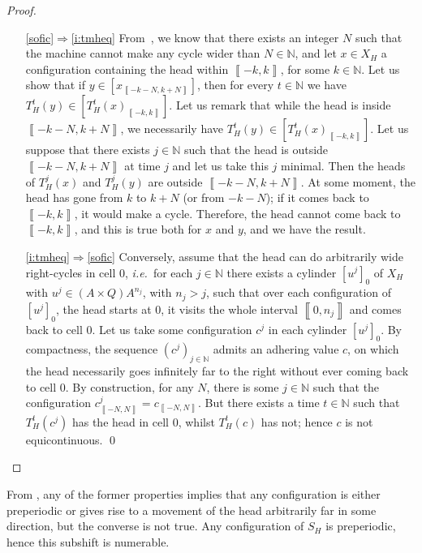 \documentclass{llncs}
\newcommand{\Nset}{{\mathbb N}}
\newcommand{\co}[2]{\left\llbracket #1,#2\right\llbracket}\newcommand{\cc}[2]{\left\llbracket #1,#2\right\rrbracket}\newcommand{\oo}[2]{\left\rrbracket #1,#2\right\llbracket}\newcommand{\oc}[2]{\left\rrbracket #1,#2\right\rrbracket}\newcommand{\ci}[1]{\co{#1}\infty}\newcommand{\io}[1]{\oo{-\infty}{#1}}\newcommand{\oi}[1]{\oo{#1}\infty}\newcommand{\ic}[1]{\oc{-\infty}{#1}}
\newcommand{\scc}[2]{_{\cc{#1}{#2}}}\newcommand{\sco}[2]{_{\co{#1}{#2}}}\newcommand{\soo}[2]{_{\oo{#1}{#2}}}\newcommand{\soc}[2]{_{\oc{#1}{#2}}}\newcommand{\sci}[1]{_{\ci{#1}}}\newcommand{\sio}[1]{_{\io{#1}}}\newcommand{\soi}[1]{_{\oi{#1}}}\newcommand{\sic}[1]{_{\ic{#1}}}
\newcommand{\ie}{\textit{i.e.}\ }
\begin{document}
\begin{proof}~\begin{itemize}
 \item[\ref{sofic}$\Rightarrow$\ref{i:tmheq}]
 From~\cite{Gaja07}, we know that there exists an integer $N$ such that the machine cannot make any cycle wider than $N\in\Nset$, and let $x\in X_H$ a configuration containing the head within $\cc{-k}k$, for some $k\in\Nset$.
 Let us show that if $y\in[x\scc{-k-N}{k+N}]$, then for every $t\in\Nset$ we have $T_H^t(y)\in[T_H^t(x)\scc{-k}k]$.
 Let us remark that while the head is inside $\cc{-k-N}{k+N}$, we necessarily have $T_H^t(y)\in[T_H^t(x)\scc{-k}k]$.
 Let us suppose that there exists $j\in\Nset$ such that the head is outside $\cc{-k-N}{k+N}$ at time $j$ and let us take this $j$ minimal.
 Then the heads of $T_H^j(x)$ and $T_H^j(y)$ are outside $\cc{-k-N}{k+N}$.
 At some moment, the head has gone from $k$ to $k+N$ (or from $-k-N$); if it comes back to $\cc{-k}k$, it would make a cycle.
 Therefore, the head cannot come back to $\cc{-k}{k}$, and this is true both for $x$ and $y$, and we have the result.
\item[\ref{i:tmheq}$\Rightarrow$\ref{sofic}]
  Conversely, assume that the head can do arbitrarily wide right-cycles in cell $0$, \ie for each $j\in\Nset$ there exists a cylinder $[u^j]_0$ of $X_H$ with $u^j\in (A\times Q)A^{n_j}$, with $n_j>j$, such that over each configuration of $[u^j]_0$, the head starts at $0$, it visits the whole interval $\cc0{n_j}$ and comes back to cell $0$.
 Let us take some configuration $c^j$ in each cylinder $[u^j]_0$.
 By compactness, the sequence $(c^j)_{j\in\Nset}$ admits an adhering value $c$, on which the head necessarily goes infinitely far to the right without ever coming back to cell $0$.
 By construction, for any $N$, there is some $j\in\Nset$ such that the configuration $c^j\scc{-N}N=c\scc{-N}N$.
 But there exists a time $t\in\Nset$ such that $T_H^t(c^j)$ has the head in cell $0$, whilst $T_H^t(c)$ has not; hence $c$ is not equicontinuous.
 \qed
\end{itemize}
\end{proof}
From \cite{GajaJAC}, any of the former properties implies that any configuration is either preperiodic or gives rise to a movement of the head arbitrarily far in some direction, but the converse is not true.
Any configuration of $S_H$ is preperiodic, hence this subshift is numerable.
\end{document}
